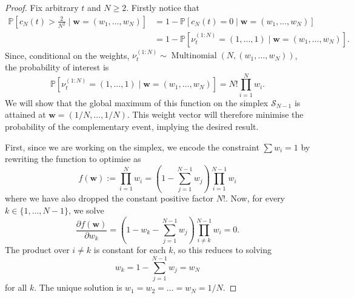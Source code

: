 \documentclass{article}
\newcommand{\PR}{\mathbb{P}}
\newcommand{\Mn}{\operatorname{Multinomial}}
\begin{document}
\begin{proof}
Fix arbitrary $t$ and $N\geq 2$. Firstly notice that
\begin{align*}
\PR \left[c_N(t) > \frac{2}{N^2} \mid \mathbf{w}=(w_1, \dots, w_N) \right]
&= 1- \PR[c_N(t) = 0  \mid \mathbf{w}=(w_1, \dots, w_N)] \\
&= 1- \PR[\nu_t^{(1:N)} = (1,\dots, 1) \mid \mathbf{w}=(w_1, \dots, w_N)].
\end{align*}
Since, conditional on the weights, $\nu_t^{(1:N)} \sim \Mn(N, (w_1, \dots, w_N))$, the probability of interest is
\begin{equation*}
\PR[\nu_t^{(1:N)} = (1,\dots, 1) \mid \mathbf{w}=(w_1, \dots, w_N)] =
N! \prod_{i=1}^N w_i .
\end{equation*}
We will show that the global maximum of this function on the simplex $\mathcal{S}_{N-1}$ is attained at $\mathbf{w}=(1/N,\dots,1/N)$.
This weight vector will therefore minimise the probability of the complementary event, implying the desired result.

First, since we are working on the simplex, we encode the constraint $\sum w_i =1$ by rewriting the function to optimise as
\begin{equation*}
f(\mathbf{w}) :=
\prod_{i=1}^N w_i
= \left(1- \sum_{j=1}^{N-1} w_j \right)\prod_{i=1}^{N-1} w_i 
\end{equation*}
where we have also dropped the constant positive factor $N!$. 
Now, for every $k \in \{1,\dots,N-1\}$, we solve
\begin{equation*}
\frac{\partial f(\mathbf{w})}{\partial w_k}
= \left(1- w_k - \sum_{j=1}^{N-1} w_j \right)\prod_{i\neq k}^{N-1} w_i 
=0 .
\end{equation*}
The product over $i \neq k$ is constant for each $k$, so this reduces to solving
\begin{equation*}
w_k = 1- \sum_{j=1}^{N-1} w_j = w_N
\end{equation*}
for all $k$.
The unique solution is
$w_1 = w_2= \dots =  w_N = 1/N$.


\end{proof}
\end{document}
